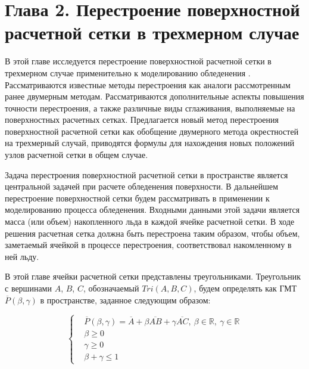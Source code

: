 \newpage
\section*{Глава 2. Перестроение поверхностной расчетной сетки в трехмерном случае} %
\addtocounter{section}{1}                                                                             %
\setcounter{subsection}{0}
\setcounter{figure}{0}
\setcounter{equation}{0}
\setcounter{table}{0}
\setcounter{theorem}{0}
\setcounter{lemma}{0}
\setcounter{definition}{0}

В этой главе исследуется перестроение поверхностной расчетной сетки в трехмерном случае применительно к моделированию обледенения \cite{Meshcheryakov2023GeoEvo}.
Рассматриваются известные методы перестроения как аналоги рассмотренным ранее двумерным методам.
Рассматриваются дополнительные аспекты повышения точности перестроения, а также различные виды сглаживания, выполняемые на поверхностных расчетных сетках.
Предлагается новый метод перестроения поверхностной расчетной сетки как обобщение двумерного метода окрестностей на трехмерный случай, приводятся формулы для нахождения новых положений узлов расчетной сетки в общем случае.

Задача перестроения поверхностной расчетной сетки в пространстве является центральной задачей при расчете обледенения поверхности.
В дальнейшем перестроение поверхностной сетки будем рассматривать в применении к моделированию процесса обледенения.
Входными данными этой задачи является масса (или объем) накопленного льда в каждой ячейке расчетной сетки.
В ходе решения расчетная сетка должна быть перестроена таким образом, чтобы объем, заметаемый ячейкой в процессе перестроения, соответствовал накомленному в ней льду.

В этой главе ячейки расчетной сетки представлены треугольниками.
Треугольник с вершинами $A$, $B$, $C$, обозначаемый $Tri(A, B, C)$, будем определять как ГМТ $\overline{P}(\beta, \gamma)$ в пространстве, заданное следующим образом:

\begin{equation}\label{eqn:text_1_geo_prim_triangle}
	\left\{
		\begin{aligned}
			& \overline{P}(\beta, \gamma) = \overline{A} + \beta \overline{AB} + \gamma \overline{AC}, \ \beta \in \mathbb{R}, \ \gamma \in \mathbb{R} \\
			& \beta \ge 0 \\
			& \gamma \ge 0 \\
			& \beta + \gamma \le 1
		\end{aligned}
	\right.
\end{equation}

